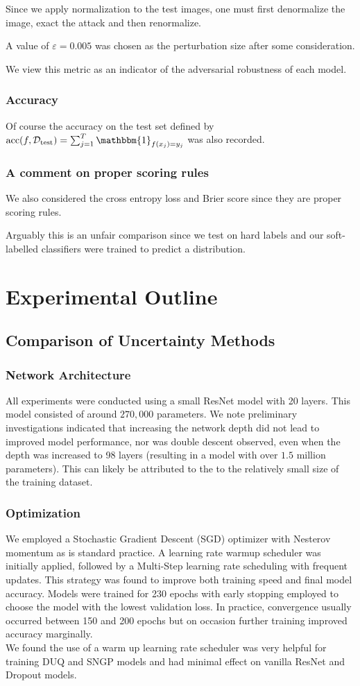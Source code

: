 \documentclass{article}
\begin{document}
Since we apply normalization to the test images, one must first denormalize the image, exact the attack and then renormalize.  

A value of $\varepsilon =0.005$ was chosen as the perturbation size after some consideration. 

We view this metric as an indicator of the adversarial robustness of each model. 
\subsubsection*{Accuracy}
Of course the accuracy on the test set defined by $\text{acc}(f, \mathcal{D}_{\text{test}}) = \sum_{j=1}^{T} {\mathbbm{1}_{f(x_j) = y_j}}$ was also recorded.


\subsubsection*{A comment on proper scoring rules} 
We also considered the cross entropy loss and Brier score since they are proper scoring rules. 

Arguably this is an unfair comparison since we test on hard labels and our soft-labelled classifiers were trained to predict a distribution. 
\section{Experimental Outline}
\subsection{Comparison of Uncertainty Methods}
\subsubsection*{Network Architecture}
All experiments were conducted using a small ResNet model with 20 layers. This model consisted of around $270,000$ parameters. We note preliminary investigations indicated that increasing the network depth did not lead to improved model performance, nor was double descent observed, even when the depth was increased to 98 layers (resulting in a model with over $1.5$ million parameters). This can likely be attributed to the to the relatively small size of the training dataset.
\subsubsection*{Optimization}
We employed a Stochastic Gradient Descent (SGD) optimizer with Nesterov momentum as is standard practice. A learning rate warmup scheduler was initially applied, followed by a Multi-Step learning rate scheduling with frequent updates. This strategy was found to improve both training speed and final model accuracy. Models were trained for 230 epochs with early stopping employed to choose the model with the lowest validation loss. In practice, convergence usually occurred between 150 and 200 epochs but on occasion further training improved accuracy marginally. 
\\
We found the use of a warm up learning rate scheduler was very helpful for training DUQ and SNGP models and had minimal effect on vanilla ResNet and Dropout models.  
\end{document}
